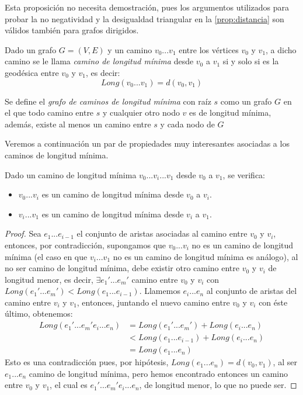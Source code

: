 Esta proposición no necesita demostración, pues los argumentos utilizados para probar la no negatividad y la desigualdad triangular en la \autoref{prop:distancia} son válidos también para grafos dirigidos.

\begin{definicion}
	Dado un grafo $G=(V,E)$ y un camino $v_0...v_1$ entre los vértices $v_0$ y $v_1$, a dicho camino se le llama \textit{camino de longitud mínima} desde $v_0$ a $v_1$ si y solo si es la geodésica entre $v_0$ y $v_1$, es decir:
	$$Long(v_0...v_1) = d(v_0, v_1)$$
\end{definicion}

\begin{definicion}
	Se define el \textit{grafo de caminos de longitud mínima} con raíz $s$ como un grafo $G$ en el que todo camino entre $s$ y cualquier otro nodo $v$ es de longitud mínima, además, existe al menos un camino entre $s$ y cada nodo de $G$
\end{definicion}

Veremos a continuación un par de propiedades muy interesantes asociadas a los caminos de longitud mínima.

\begin{proposicion}\label{prop:separa_cam_min_long}
	Dado un camino de longitud mínima $v_0...v_i...v_1$ desde $v_0$ a $v_1$, se verifica:
	\begin{itemize}
		\item $v_0...v_i$ es un camino de longitud mínima desde $v_0$ a $v_i$.
		\item $v_i...v_1$ es un camino de longitud mínima desde $v_i$ a $v_1$.
	\end{itemize}
\end{proposicion}

\begin{proof}
	Sea $e_1...e_{i-1}$ el conjunto de aristas asociadas al camino entre $v_0$ y $v_i$, entonces, por contradicción, supongamos que $v_0...v_i$ no es un camino de longitud mínima (el caso en que $v_i...v_1$ no es un camino de longitud mínima es análogo), al no ser camino de longitud mínima, debe existir otro camino entre $v_0$ y $v_i$ de longitud menor, es decir, $\exists e_1'...e_m'$ camino entre $v_0$ y $v_i$ con $Long(e_1'...e_m') < Long(e_1...e_{i-1})$. Llamemos $e_i...e_n$ al conjunto de aristas del camino entre $v_i$ y $v_1$, entonces, juntando el nuevo camino entre $v_0$ y $v_i$ con éste último, obtenemos:
	\begin{equation}
		\begin{split}
			Long(e_1'...e_m'e_i...e_n) & =Long(e_1'...e_m') + Long(e_i...e_n) \\
			& < Long(e_1...e_{i-1}) + Long(e_i...e_n) \\
			& =	Long(e_1...e_n)
		\end{split}
	\end{equation}
	Esto es una contradicción pues, por hipótesis, $Long(e_1...e_n) = d(v_0,v_1)$, al ser $e_1...e_n$ camino de longitud mínima, pero hemos encontrado entonces un camino entre $v_0$ y $v_1$, el cual es $e_1'...e_m'e_i...e_n$, de longitud menor, lo que no puede ser.
\end{proof}

